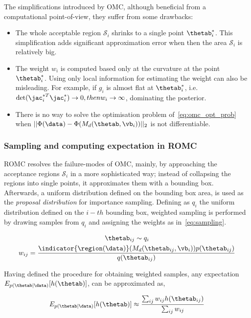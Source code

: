 The simplifications introduced by OMC, although beneficial from a
computational point-of-view, they suffer from some drawbacks:

\begin{itemize}
\item The whole acceptable region $\mathcal{S}_i$
  shrinks to a single point $\thetab_i^*$. This simplification adds
  significant approximation error when then the area $\mathcal{S}_i$ is relatively big.
\item The weight $w_i$ is computed based only at the curvature at the
  point $\thetab_i^*$. Using only local information for estimating the
  weight can also be misleading. For example, if $g_i$ is almost flat
  at $\thetab_i^*$, i.e.
  $\text{det}(\jac_i^{*T}\jac_i^*) \rightarrow 0, then w_i \rightarrow
  \infty$, dominating the posterior.
\item There is no way to solve the optimisation problem
  of~\eqref{eq:omc_opt_prob} when
  $||\Phi(\data)-\Phi(M_d(\thetab, \vb_i))||_2$ is not differentiable.
\end{itemize}

\subsubsection{Sampling and computing expectation in ROMC}

ROMC resolves the failure-modes of OMC, mainly, by approaching the
acceptance regions $\mathcal{S}_i$ in a more sophisticated way;
instead of collapsing the regions into single points, it approximates
them with a bounding box. Afterwards, a uniform distribution defined
on the bounding box area, is used as the \emph{proposal distribution}
for importance sampling. Defining as $q_i$ the uniform distribution
defined on the $i-th$ bounding box, weighted sampling is performed by
drawing samples from $q_i$ and assigning the weights as
in~\eqref{eq:sampling}.

\begin{gather}
  \thetab_{ij} \sim q_i \\  \label{eq:sampling}
  w_{ij} = \frac{\indicator{\region(\data)}(M_d(\thetab_{ij}, \vb_i)) p(\thetab_{ij})}{q(\thetab_{ij})}
\end{gather}

\noindent

Having defined the procedure for obtaining weighted samples, any
expectation $E_{p(\thetab|\data)}[h(\thetab)]$, can be approximated
as,

\begin{equation} \label{eq:expectation}
  E_{p(\thetab|\data)}[h(\thetab)] \approx \frac{\sum_{ij} w_{ij} h(\thetab_{ij})}{\sum_{ij} w_{ij}}
\end{equation}

